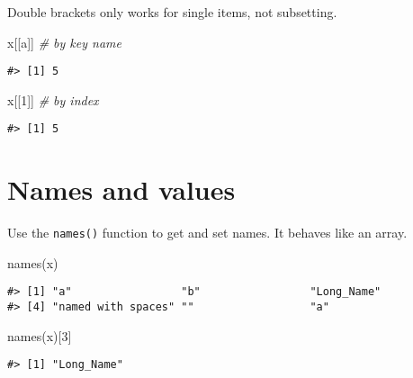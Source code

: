 \documentclass[
]{book}
\newenvironment{Shaded}{\begin{snugshade}}{\end{snugshade}}
\newcommand{\CommentTok}[1]{\textcolor[rgb]{0.56,0.35,0.01}{\textit{#1}}}
\newcommand{\DecValTok}[1]{\textcolor[rgb]{0.00,0.00,0.81}{#1}}
\newcommand{\FunctionTok}[1]{\textcolor[rgb]{0.00,0.00,0.00}{#1}}
\newcommand{\NormalTok}[1]{#1}
\newcommand{\StringTok}[1]{\textcolor[rgb]{0.31,0.60,0.02}{#1}}
\begin{document}
Double brackets only works for single items, not subsetting.

\begin{Shaded}
\begin{Highlighting}[]
\NormalTok{x[[}\StringTok{\textquotesingle{}a\textquotesingle{}}\NormalTok{]] }\CommentTok{\# by key name}
\end{Highlighting}
\end{Shaded}

\begin{verbatim}
#> [1] 5
\end{verbatim}

\begin{Shaded}
\begin{Highlighting}[]
\NormalTok{x[[}\DecValTok{1}\NormalTok{]]   }\CommentTok{\# by index}
\end{Highlighting}
\end{Shaded}

\begin{verbatim}
#> [1] 5
\end{verbatim}

\hypertarget{names-and-values}{%
\section{Names and values}\label{names-and-values}}

Use the \texttt{names()} function to get and set names. It behaves like an array.

\begin{Shaded}
\begin{Highlighting}[]
\FunctionTok{names}\NormalTok{(x)}
\end{Highlighting}
\end{Shaded}

\begin{verbatim}
#> [1] "a"                 "b"                 "Long_Name"        
#> [4] "named with spaces" ""                  "a"
\end{verbatim}

\begin{Shaded}
\begin{Highlighting}[]
\FunctionTok{names}\NormalTok{(x)[}\DecValTok{3}\NormalTok{]}
\end{Highlighting}
\end{Shaded}

\begin{verbatim}
#> [1] "Long_Name"
\end{verbatim}
\end{document}
